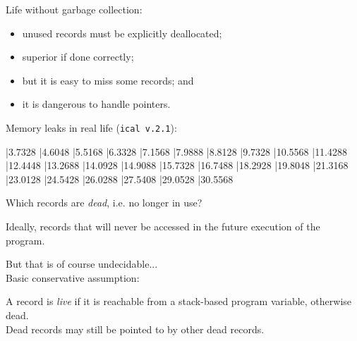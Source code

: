 \begin{slide*}
Life without garbage collection:
\begin{itemize}
\item unused records must be explicitly deallocated;
\item superior if done correctly;
\item but it is easy to miss some records; and
\item it is dangerous to handle pointers.
\end{itemize}
\vspace*{2ex}

Memory leaks in real life ({\tt ical v.2.1}):\\

\begin{barenv}
\setstyle{\tiny}
\bar{3.732}{8}
\bar{4.604}{8}
\bar{5.516}{8}
\bar{6.332}{8}
\bar{7.156}{8}
\bar{7.988}{8}
\bar{8.812}{8} 
\bar{9.732}{8} 
\bar{10.556}{8}
\bar{11.428}{8}
\bar{12.444}{8}
\bar{13.268}{8}
\bar{14.092}{8}
\bar{14.908}{8}
\bar{15.732}{8}
\bar{16.748}{8}
\bar{18.292}{8}
\bar{19.804}{8}
\bar{21.316}{8}
\bar{23.012}{8}
\bar{24.542}{8}
\bar{26.028}{8}
\bar{27.540}{8}
\bar{29.052}{8}
\bar{30.556}{8}
\end{barenv}
\vfil
\end{slide*}
 
\begin{slide*}
Which records are {\em dead}, i.e. no longer in use?

Ideally, records that will never be accessed in the future
execution of the program.

But that is of course undecidable...\\

Basic conservative assumption:

A record is {\em live\/} if it is reachable from a 
stack-based program variable, otherwise dead.\\

Dead records may still be pointed to by other dead records.
\vfil
\end{slide*}
 
